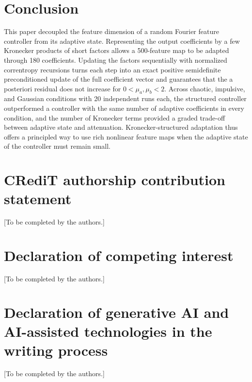 \documentclass[preprint,12pt]{elsarticle}
\begin{document}
\section{Conclusion}
This paper decoupled the feature dimension of a random Fourier feature controller from its adaptive state. Representing the output coefficients by a few Kronecker products of short factors allows a 500-feature map to be adapted through 180 coefficients. Updating the factors sequentially with normalized correntropy recursions turns each step into an exact positive semidefinite preconditioned update of the full coefficient vector and guarantees that the a posteriori residual does not increase for $0 < \mu_a, \mu_b < 2$. Across chaotic, impulsive, and Gaussian conditions with 20 independent runs each, the structured controller outperformed a controller with the same number of adaptive coefficients in every condition, and the number of Kronecker terms provided a graded trade-off between adaptive state and attenuation. Kronecker-structured adaptation thus offers a principled way to use rich nonlinear feature maps when the adaptive state of the controller must remain small.
\section*{CRediT authorship contribution statement}
[To be completed by the authors.]
\section*{Declaration of competing interest}
[To be completed by the authors.]
\section*{Declaration of generative AI and AI-assisted technologies in the writing process}
[To be completed by the authors.]
\end{document}
